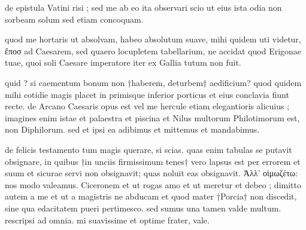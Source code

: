 de epistula Vatini risi ; sed me ab eo ita observari scio ut eius ista odia non sorbeam solum sed etiam concoquam.

 quod me hortaris ut absolvam, habeo absolutum suave, mihi quidem uti videtur, ἔποσ ad Caesarem, sed quaero locupletem tabellarium, ne accidat quod Erigonae tuae, quoi soli Caesare imperatore iter ex Gallia tutum non fuit.

 quid ? si caementum bonum non †haberem, deturbem† aedificium? quod quidem mihi cotidie magis placet in primisque inferior porticus et eius conclavia fiunt recte. de Arcano Caesaris opus est vel me hercule etiam elegantioris alicuius ; imagines enim istae et palaestra et piscina et Nilus multorum Philotimorum est, non Diphilorum. sed et ipsi ea adibimus et mittemus et mandabimus.

 de felicis testamento tum magis querare, si scias. quas enim tabulas se putavit obsignare, in quibus †in unciis firmissimum tenes† vero lapsus est per errorem et suum et sicurae servi non obsignavit; quas noluit eas obsignavit. Ἀλλ' οἰμωζέτω: nos modo valeamus. Ciceronem et ut rogas amo et ut meretur et debeo ; dimitto autem a me et ut a magistris ne abducam et quod mater †Porcia† non discedit, sine qua edacitatem pueri pertimesco. sed sumus una tamen valde multum. rescripsi ad omnia. mi suavissime et optime frater, vale.
